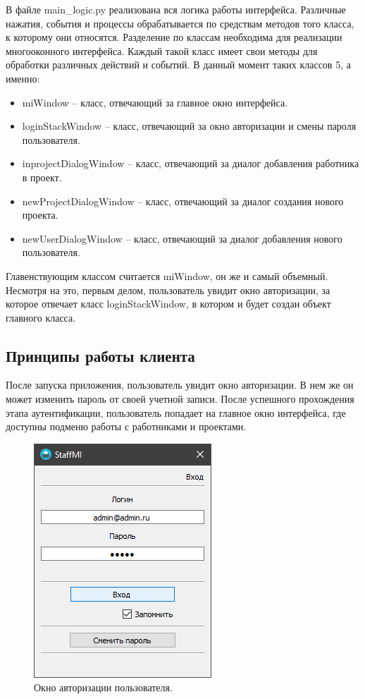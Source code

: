 \documentclass[14pt, a4paper]{extarticle}
\begin{document}
    

    В файле main\_logic.py реализована вся логика работы интерфейса. Различные нажатия, события и процессы обрабатывается по средствам методов того класса, к которому они относятся. Разделение по классам необходима для реализации многооконного интерфейса. Каждый такой класс имеет свои методы для обработки различных действий и событий. В данный момент таких классов 5, а именно:
    \begin{itemize}
        \item miWindow – класс, отвечающий за главное окно интерфейса.
        \item loginStackWindow – класс, отвечающий за окно авторизации и смены пароля пользователя.
        \item inprojectDialogWindow – класс, отвечающий за диалог добавления работника в проект.
        \item newProjectDialogWindow – класс, отвечающий за диалог создания нового проекта.
        \item newUserDialogWindow – класс, отвечающий за диалог добавления нового пользователя.
    \end{itemize}

    Главенствующим классом считается miWindow, он же и самый объемный. Несмотря на это, первым делом, пользователь увидит окно авторизации, за которое отвечает класс loginStackWindow, в котором и будет создан объект главного класса.


    \clearpage
    \subsection{Принципы работы клиента}
    После запуска приложения, пользователь увидит окно авторизации. В нем же он может изменить пароль от своей учетной записи. После успешного прохождения этапа аутентификации, пользователь попадает на главное окно интерфейса, где доступны подменю работы с работниками и проектами.
    
    \begin{figure}[h]
        \centering
        \includegraphics[width=0.4\linewidth]{img/auth_window_win.png}
        \caption{Окно авторизации пользователя.}
        \label{fig:auth_window_win}
    \end{figure}
\end{document}
